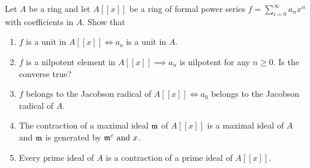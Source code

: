 \begin{exercise}{}{}
	Let \( A \) be a ring and let \( A[[x]] \) be a ring of formal
	power series \( f = \sum_{i=0}^{\infty} a_n x^n \) with coefficients
	in \( A \).
	Show that
	\begin{enumerate}
		\item \( f \) is a unit in \( A[[x]] \iff a_o \) is a unit in \( A \).
		\item \( f \) is a nilpotent element in \( A[[x]] \implies a_n \) is
		nilpotent for any \( n \geq 0 \).
		Is the converse true?
		\item \( f \) belongs to the Jacobson radical of \( A[[x]] \iff
		a_0 \) belongs to the Jacobson radical of \( A \).
		\item The contraction of a maximal ideal \( \mathfrak{m} \) of \( A[[x]] \)
		is a maximal ideal of \( A \) and \( \mathfrak{m} \) is generated by
		\( \mathfrak{m}^c \text{ and } x \).
		\item Every prime ideal of \( A \) is a contraction of a prime ideal
		of \( A[[x]] \).
	\end{enumerate}
\end{exercise}

